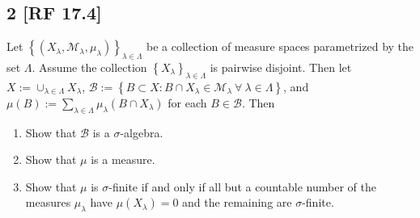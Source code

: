 \documentclass[12pt]{article}
\begin{document}
\subsection*{2 [RF 17.4]}
\begin{tcolorbox}
Let $\left\{ (X_{\lambda}, \mathcal{M}_{\lambda}, \mu_{\lambda}) \right\}_{\lambda \in \Lambda}$ be a collection of measure spaces parametrized by the
set $\Lambda$. Assume the collection $\left\{ X_{\lambda} \right\}_{\lambda\in\Lambda}$ is pairwise disjoint. Then let $X := \cup_{\lambda \in
\Lambda}X_{\lambda}$, $\mathcal{B} := \left\{ B \subset X : B\cap X_{\lambda} \in \mathcal{M}_{\lambda}\ \forall \ \lambda \in \Lambda \right\}$, and
$\mu(B) := \sum_{\lambda\in\Lambda}\mu_{\lambda}(B\cap X_{\lambda})$ for each $B\in\mathcal{B}$. Then 
\begin{enumerate}[label=(\roman*)]
\item Show that $\mathcal{B}$ is a $\sigma$-algebra.
\item Show that $\mu$ is a measure.
\item Show that $\mu$ is $\sigma$-finite if and only if all but a countable number of the measures $\mu_{\lambda}$ have $\mu(X_{\lambda}) = 0$ and the
remaining are $\sigma$-finite.
\end{enumerate}
\end{tcolorbox}
\end{document}

